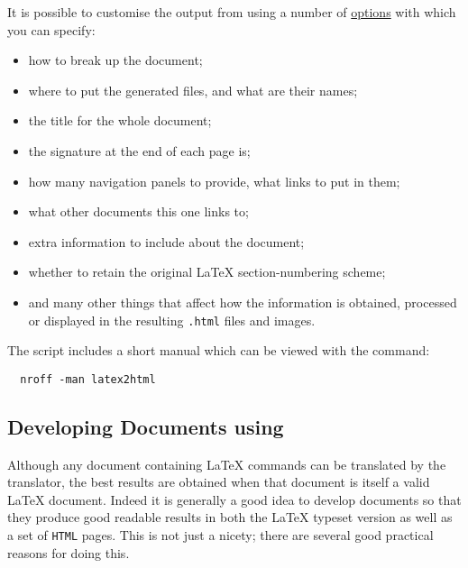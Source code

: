 \medskip
{}\html{\\}\noindent
It is possible to customise the output from \latextohtml{} using a number of 
\hyperref{command-line options}{command-line options (see Section~}{)}{options}
with which you can specify:
\begin{itemize}
\item
how to break up the document; 
\item
where to put the generated files, and what are their names;
\item
the title for the whole document; 
\item
the signature at the end of each page is; 
\item
how many navigation panels to provide, what links to put in them;
\item
what other documents this one links to;
\item 
extra information to include about the document;
\item 
whether to retain the original \LaTeX{} section-numbering scheme;
\item
and many other things that affect how the information is obtained,
processed or displayed in the resulting \texttt{.html} files and images.
\end{itemize}

\medskip
{}\html{\\}\noindent
The \latextohtml{} script includes a short manual
which can be viewed with the command: 
\begin{verbatim}
  nroff -man latex2html
\end{verbatim}


\subsection{Developing Documents using \latextohtml{}\label{devel}}
%
Although any document containing \LaTeX{} commands can be translated
by the \latextohtml{} translator, the best results are obtained when
that document is itself a valid \LaTeX{} document.
Indeed it is generally a good idea to develop documents so that
they produce good readable results in both the \LaTeX{} typeset
version as well as a set of \texttt{HTML} pages.
This is not just a nicety; 
there are several good practical reasons for doing this.


